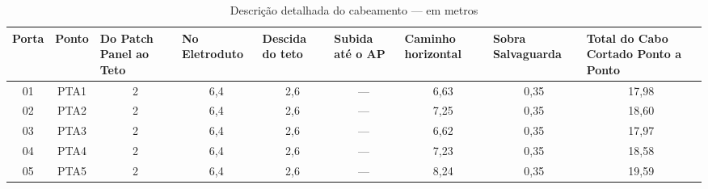\begin{table}[h!]
	\caption{Descrição detalhada do cabeamento --- em metros}
	\label{tab9}
\begin{tabular}{|c|c|c|c|c|c|c|c|c|}
	\hline

	\textbf{Porta}     & \textbf{Ponto}     & \multicolumn{1}{l|}{\textbf{Do Patch Panel ao Teto}} & \multicolumn{1}{l|}{\textbf{No Eletroduto}} & \multicolumn{1}{l|}{\textbf{Descida do teto}} & \multicolumn{1}{l|}{\textbf{Subida até o AP}} & \multicolumn{1}{l|}{\textbf{Caminho horizontal}} & \multicolumn{1}{l|}{\textbf{Sobra Salvaguarda}} & \multicolumn{1}{l|}{\textbf{Total do Cabo Cortado Ponto a Ponto}} \\ \hline
	01                 & PTA1               & 2                                                    & 6,4                                         & 2,6                                           & ---                                           & 6,63                                             & 0,35                                            & 17,98                                                             \\ \hline
	02                 & PTA2               & 2                                                    & 6,4                                         & 2,6                                           & ---                                           & 7,25                                             & 0,35                                            & 18,60                                                             \\ \hline
	03                 & PTA3               & 2                                                    & 6,4                                         & 2,6                                           & ---                                           & 6,62                                             & 0,35                                            & 17,97                                                             \\ \hline
	04                 & PTA4               & 2                                                    & 6,4                                         & 2,6                                           & ---                                           & 7,23                                             & 0,35                                            & 18,58                                                             \\ \hline
	05                 & PTA5               & 2                                                    & 6,4                                         & 2,6                                           & ---                                           & 8,24                                             & 0,35                                            & 19,59                                                             \\ \hline

\end{tabular}
\end{table}
